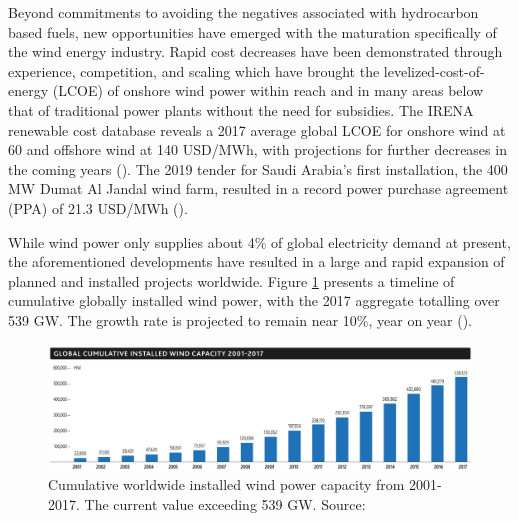 Beyond commitments to avoiding the negatives associated with hydrocarbon based fuels, new opportunities have emerged with the maturation specifically of the wind energy industry. Rapid cost decreases have been demonstrated through experience, competition, and scaling which have brought the levelized-cost-of-energy (LCOE) of onshore wind power within reach and in many areas below that of traditional power plants without the need for subsidies. The IRENA renewable cost database reveals a 2017 average global LCOE for onshore wind at 60 and offshore wind at 140 USD/MWh, with projections for further decreases in the coming years (\cite{IRENA_2018}). The 2019 tender for Saudi Arabia's first installation, the 400 MW Dumat Al Jandal wind farm, resulted in a record power purchase agreement (PPA) of 21.3 USD/MWh (\cite{masdar_edf_2019}).

While wind power only supplies about 4\% of global electricity demand at present, the aforementioned developments have resulted in a large and rapid expansion of planned and installed projects worldwide. Figure \ref{fig:wind_power_cum} presents a timeline of cumulative globally installed wind power, with the 2017 aggregate totalling over 539 GW. The growth rate is projected to remain near 10\%, year on year (\cite{gwec_global_2017}).

\begin{figure}[htbp]
    \centering
        \includegraphics[width=1.0\textwidth]{graphics/intro/motivation_market/wind_power_cum.png}
    \caption{Cumulative worldwide installed wind power capacity from 2001-2017. The current value exceeding 539 GW. Source: \cite{gwec_global_2017}}
    \label{fig:wind_power_cum}
\end{figure}

\clearpage
